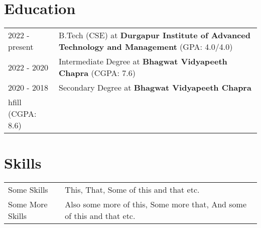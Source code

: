 \documentclass[a4paper,12pt]{article}
\begin{document}
\section{Education}
\begin{tabularx}{\linewidth}{@{}l X@{}}
2022 - present & B.Tech (CSE) at \textbf{Durgapur Institute of Advanced Technology and Management} \hfill \normalsize   (GPA: 4.0/4.0) \\

2022 - 2020 & Intermediate Degree at \textbf{Bhagwat Vidyapeeth Chapra} \hfill (CGPA: 7.6) \\ 

2020 - 2018 & Secondary Degree at \textbf{Bhagwat Vidyapeeth Chapra} \\hfill (CGPA: 8.6) \\

\end{tabularx}


\section{Skills}
\begin{tabularx}{\linewidth}{@{}l X@{}}
Some Skills &  \normalsize{This, That, Some of this and that etc.}\\
Some More Skills  &  \normalsize{Also some more of this, Some more that, And some of this and that etc.}\\  
\end{tabularx}

\vfill
{}
\end{document}
